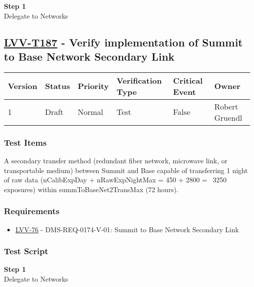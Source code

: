 \textbf{Step 1}\\
Delegate to Networks\\[2\baselineskip]

\hypertarget{lvv-t187---verify-implementation-of-summit-to-base-network-secondary-link}{\subsection{\texorpdfstring{\href{https://jira.lsstcorp.org/secure/Tests.jspa\#/testCase/LVV-T187}{LVV-T187}
- Verify implementation of Summit to Base Network Secondary
Link}{LVV-T187 - Verify implementation of Summit to Base Network Secondary Link}}\label{lvv-t187---verify-implementation-of-summit-to-base-network-secondary-link}}

\begin{longtable}[]{@{}llllll@{}}
\toprule
Version & Status & Priority & Verification Type & Critical Event &
Owner\tabularnewline
\midrule
\endhead
1 & Draft & Normal & Test & False & Robert Gruendl\tabularnewline
\bottomrule
\end{longtable}

\subsubsection{Test Items}\label{test-items-46}

A secondary transfer method (redundant fiber network, microwave link, or
transportable medium) between Summit and Base capable of transferring 1
night of raw data (nCalibExpDay + nRawExpNightMax = 450 + 2800 = ~3250
exposures) within summToBaseNet2TransMax (72 hours). ~

\subsubsection{Requirements}\label{requirements-46}

\begin{itemize}
\tightlist
\item
  \href{https://jira.lsstcorp.org/browse/LVV-76}{LVV-76} -
  DMS-REQ-0174-V-01: Summit to Base Network Secondary Link
\end{itemize}

\subsubsection{Test Script}\label{test-script-46}

\textbf{Step 1}\\
Delegate to Networks\\[2\baselineskip]


